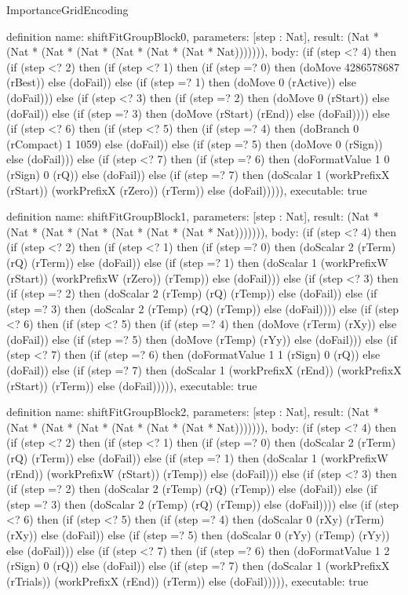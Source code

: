 \begin{lexlean}{ImportanceGridEncoding}
\begin{semanticmodule}
definition{
  name: shiftFitGroupBlock0,
  parameters: [step : Nat],
  result: (Nat * (Nat * (Nat * (Nat * (Nat * (Nat * (Nat * Nat))))))),
  body: (if (step <? 4) then
      (if (step <? 2) then
      (if (step <? 1) then
      (if (step =? 0) then (doMove 4286578687 (rBest)) else (doFail)) else
      (if (step =? 1) then (doMove 0 (rActive)) else (doFail))) else
      (if (step <? 3) then
      (if (step =? 2) then (doMove 0 (rStart)) else (doFail)) else
      (if (step =? 3) then (doMove (rStart) (rEnd)) else (doFail)))) else
      (if (step <? 6) then
      (if (step <? 5) then
      (if (step =? 4) then (doBranch 0 (rCompact) 1 1059) else (doFail)) else
      (if (step =? 5) then (doMove 0 (rSign)) else (doFail))) else
      (if (step <? 7) then
      (if (step =? 6) then (doFormatValue 1 0 (rSign) 0 (rQ)) else (doFail)) else
      (if (step =? 7) then (doScalar 1 (workPrefixX (rStart)) (workPrefixX (rZero)) (rTerm)) else (doFail))))),
  executable: true
}

definition{
  name: shiftFitGroupBlock1,
  parameters: [step : Nat],
  result: (Nat * (Nat * (Nat * (Nat * (Nat * (Nat * (Nat * Nat))))))),
  body: (if (step <? 4) then
      (if (step <? 2) then
      (if (step <? 1) then
      (if (step =? 0) then (doScalar 2 (rTerm) (rQ) (rTerm)) else (doFail)) else
      (if (step =? 1) then (doScalar 1 (workPrefixW (rStart)) (workPrefixW (rZero)) (rTemp)) else (doFail))) else
      (if (step <? 3) then
      (if (step =? 2) then (doScalar 2 (rTemp) (rQ) (rTemp)) else (doFail)) else
      (if (step =? 3) then (doScalar 2 (rTemp) (rQ) (rTemp)) else (doFail)))) else
      (if (step <? 6) then
      (if (step <? 5) then
      (if (step =? 4) then (doMove (rTerm) (rXy)) else (doFail)) else
      (if (step =? 5) then (doMove (rTemp) (rYy)) else (doFail))) else
      (if (step <? 7) then
      (if (step =? 6) then (doFormatValue 1 1 (rSign) 0 (rQ)) else (doFail)) else
      (if (step =? 7) then (doScalar 1 (workPrefixX (rEnd)) (workPrefixX (rStart)) (rTerm)) else (doFail))))),
  executable: true
}

definition{
  name: shiftFitGroupBlock2,
  parameters: [step : Nat],
  result: (Nat * (Nat * (Nat * (Nat * (Nat * (Nat * (Nat * Nat))))))),
  body: (if (step <? 4) then
      (if (step <? 2) then
      (if (step <? 1) then
      (if (step =? 0) then (doScalar 2 (rTerm) (rQ) (rTerm)) else (doFail)) else
      (if (step =? 1) then (doScalar 1 (workPrefixW (rEnd)) (workPrefixW (rStart)) (rTemp)) else (doFail))) else
      (if (step <? 3) then
      (if (step =? 2) then (doScalar 2 (rTemp) (rQ) (rTemp)) else (doFail)) else
      (if (step =? 3) then (doScalar 2 (rTemp) (rQ) (rTemp)) else (doFail)))) else
      (if (step <? 6) then
      (if (step <? 5) then
      (if (step =? 4) then (doScalar 0 (rXy) (rTerm) (rXy)) else (doFail)) else
      (if (step =? 5) then (doScalar 0 (rYy) (rTemp) (rYy)) else (doFail))) else
      (if (step <? 7) then
      (if (step =? 6) then (doFormatValue 1 2 (rSign) 0 (rQ)) else (doFail)) else
      (if (step =? 7) then (doScalar 1 (workPrefixX (rTrials)) (workPrefixX (rEnd)) (rTerm)) else (doFail))))),
  executable: true
}


\end{semanticmodule}
\end{lexlean}
